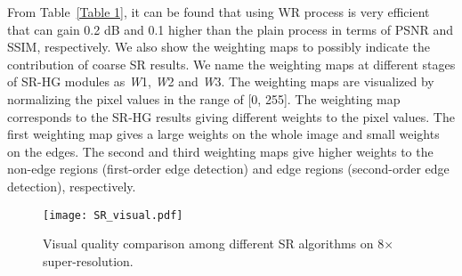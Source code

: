 \documentclass[10pt,twocolumn,letterpaper]{article}
\begin{document}
From Table~\ref{Table 1}, it can be found that using WR process is very efficient that can gain 0.2 dB and 0.1 higher than the plain process in terms of PSNR and SSIM, respectively. We also show the weighting maps to possibly indicate the contribution of coarse SR results. We name the weighting maps at different stages of SR-HG modules as \textit{W}1, \textit{W}2 and \textit{W}3. The weighting maps are visualized by normalizing the pixel values in the range of [0, 255]. The weighting map corresponds to the SR-HG results giving different weights to the pixel values. The first weighting map gives a large weights on the whole image and small weights on the edges. The second and third weighting maps give higher weights to the non-edge regions (first-order edge detection) and edge regions (second-order edge detection), respectively.
\begin{figure*}[t]
\vskip 0.01in
\begin{center}
\centerline{\texttt{[image: SR\_visual.pdf]}}
\caption{Visual quality comparison among different SR algorithms on 8$\times$ super-resolution.}
\label{Figure 9}
\end{center}
\vskip -0.3in
\end{figure*}
\end{document}
